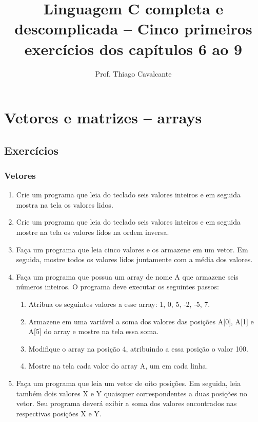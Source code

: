\documentclass[a4paper,12pt]{article}
\title{Linguagem C completa e descomplicada -- Cinco primeiros exercícios dos capítulos 6 ao 9}
\author{Prof. Thiago Cavalcante}
\date{}
\begin{document}
\maketitle

\setcounter{section}{5}

\section{Vetores e matrizes – arrays}

\subsection{Exercícios}

\subsubsection{Vetores}

\begin{enumerate}
  \item Crie um programa que leia do teclado seis valores inteiros e em seguida mostra na tela os valores lidos.
  \item Crie um programa que leia do teclado seis valores inteiros e em seguida mostre na tela os valores lidos na ordem inversa.
  \item Faça um programa que leia cinco valores e os armazene em um vetor. Em seguida, mostre todos os valores lidos juntamente com a média dos valores.
  \item Faça um programa que possua um array de nome A que armazene seis números inteiros. O programa deve executar os seguintes passos:

  \begin{enumerate}
    \item Atribua os seguintes valores a esse array: 1, 0, 5, -2, -5, 7.
    \item Armazene em uma variável a soma dos valores das posições A[0], A[1] e A[5] do array e mostre na tela essa soma.
    \item Modifique o array na posição 4, atribuindo a essa posição o valor 100.
    \item Mostre na tela cada valor do array A, um em cada linha.
  \end{enumerate}

  \item Faça um programa que leia um vetor de oito posições. Em seguida, leia também dois valores X e Y quaisquer correspondentes a duas posições no vetor. Seu programa deverá exibir a soma dos valores encontrados nas respectivas posições X e Y.
\end{enumerate}
\end{document}
